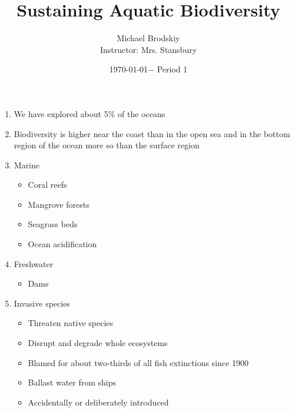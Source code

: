 \documentclass[12pt]{article}
\title{Sustaining Aquatic Biodiversity}
\date{\today $-$ Period 1}
\author{Michael Brodskiy\\ \small Instructor: Mrs. Stansbury}
\begin{document}
\maketitle

\begin{enumerate}
    
  \item We have explored about 5\% of the oceans

  \item Biodiversity is higher near the coast than in the open sea and in the bottom region of the ocean more so than the surface region

  \item Marine

    \begin{itemize}

      \item Coral reefs

      \item Mangrove forests

      \item Seagrass beds

      \item Ocean acidification

    \end{itemize}

  \item Freshwater

    \begin{itemize}

      \item Dams

    \end{itemize}

  \item Invasive species

    \begin{itemize}

      \item Threaten native species

      \item Disrupt and degrade whole ecosystems

      \item Blamed for about two-thirds of all fish extinctions since 1900

      \item Ballast water from ships

      \item Accidentally or deliberately introduced


\end{itemize}
\end{enumerate}
\end{document}
